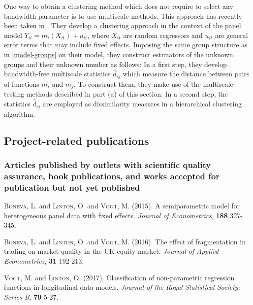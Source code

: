 \documentclass[a4paper,12pt]{article}
\begin{document}
One way to obtain a clustering method which does not require to select any bandwidth parameter is to use multiscale methods. This approach has recently been taken in \cite{VogtLinton2018}. They develop a clustering approach in the context of the panel model $Y_{it} = m_i(X_{it}) + u_{it}$, where $X_{it}$ are random regressors and $u_{it}$ are general error terms that may include fixed effects. Imposing the same group structure as in \eqref{model-groups} on their  model, they construct estimators of the unknown groups and their unknown number as follows: In a first step, they develop bandwidth-free multiscale statistics $\hat{d}_{ij}$ which measure the distance between pairs of functions $m_i$ and $m_j$. To construct them, they make use of the multiscale testing methods described in part (a) of this section. In a second step, the statistics $\hat{d}_{ij}$ are employed as dissimilarity measures in a hierarchical clustering algorithm. 


\subsection{Project-related publications}


\subsubsection{Articles published by outlets with scientific quality assurance, book publications, and works accepted for publication but not yet published}


{\small

\hangindent=0.4cm \textsc{Boneva}, L. and \textsc{Linton}, O. and \textsc{Vogt}, M. (2015). A semiparametric model for heterogeneous panel data with fixed effects. \textit{Journal of Econometrics}, \textbf{188} 327-345.

\vspace{5pt}

\noindent \hangindent=0.4cm \textsc{Boneva}, L. and \textsc{Linton}, O. and \textsc{Vogt}, M. (2016). The effect of fragmentation in trading on market quality in the UK equity market. \textit{Journal of Applied Econometrics}, \textbf{31} 192-213.

\vspace{5pt}

\noindent \hangindent=0.4cm \textsc{Vogt}, M. and \textsc{Linton}, O. (2017). Classification of non-parametric regression functions in longitudinal data models. \textit{Journal of the Royal Statistical Society: Series B}, \textbf{79} 5-27.

}
\end{document}

